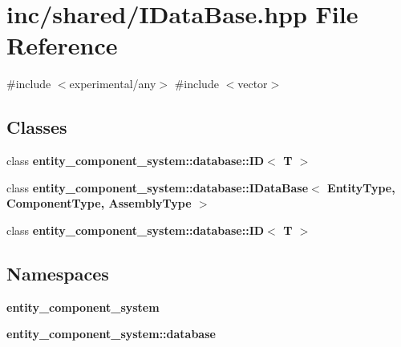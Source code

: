 \section{inc/shared/\+I\+Data\+Base.hpp File Reference}
\label{_i_data_base_8hpp}
{\ttfamily \#include $<$experimental/any$>$}\newline
{\ttfamily \#include $<$vector$>$}\newline
\subsection*{Classes}
\begin{DoxyCompactItemize}
\item 
class {\bf entity\+\_\+component\+\_\+system\+::database\+::\+I\+D$<$ T $>$}
\item 
class {\bf entity\+\_\+component\+\_\+system\+::database\+::\+I\+Data\+Base$<$ Entity\+Type, Component\+Type, Assembly\+Type $>$}
\item 
class {\bf entity\+\_\+component\+\_\+system\+::database\+::\+I\+D$<$ T $>$}
\end{DoxyCompactItemize}
\subsection*{Namespaces}
\begin{DoxyCompactItemize}
\item 
 {\bf entity\+\_\+component\+\_\+system}
\item 
 {\bf entity\+\_\+component\+\_\+system\+::database}
\end{DoxyCompactItemize}

